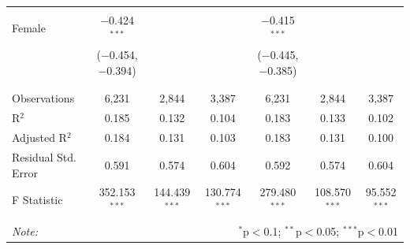 \documentclass[12pt,a4paper]{article}
\numberwithin{equation}{section}
\begin{document}
\begin{landscape}
\begin{table}[!htbp]
\begin{tabular}{@{\extracolsep{5pt}}lcccccc}
			& & & & & & \\ 
			Female & $-$0.424$^{***}$ &  &  & $-$0.415$^{***}$ &  &  \\ 
			& ($-$0.454, $-$0.394) &  &  & ($-$0.445, $-$0.385) &  &  \\ 
			& & & & & & \\ 
			\hline \\[-1.8ex] 
			Observations & 6,231 & 2,844 & 3,387 & 6,231 & 2,844 & 3,387 \\ 
			R$^{2}$ & 0.185 & 0.132 & 0.104 & 0.183 & 0.133 & 0.102 \\ 
			Adjusted R$^{2}$ & 0.184 & 0.131 & 0.103 & 0.183 & 0.131 & 0.100 \\ 
			Residual Std. Error & 0.591 & 0.574 & 0.604 & 0.592 & 0.574 & 0.604 \\ 
			F Statistic & 352.153$^{***}$ & 144.439$^{***}$ & 130.774$^{***}$ & 279.480$^{***}$ & 108.570$^{***}$ & 95.552$^{***}$ \\ 
			\hline 
			\hline \\[-1.8ex] 
			\textit{Note:}  & \multicolumn{6}{r}{$^{*}$p$<$0.1; $^{**}$p$<$0.05; $^{***}$p$<$0.01} \\ 
		\end{tabular} 
	\end{table} 
	
\end{landscape}

\newpage
\end{document}

